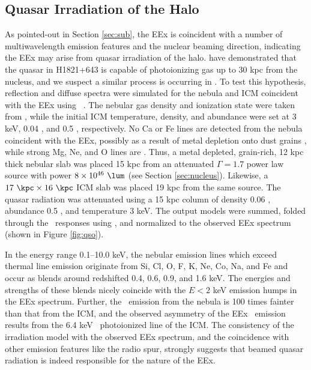 \documentclass[useAMS,usenatbib]{mn2e}
\begin{document}
\subsection{Quasar Irradiation of the Halo}

As pointed-out in Section \ref{sec:sub}, the EEx is coincident with a
number of multiwavelength emission features and the nuclear beaming
direction, indicating the EEx may arise from quasar irradiation of the
halo. \citet{2010MNRAS.402.1561R} have demonstrated that the quasar in
H1821+643 is capable of photoionizing gas up to 30 kpc from the
nucleus, and we suspect a similar process is occurring in \irs. To
test this hypothesis, reflection and diffuse spectra were simulated
for the nebula and ICM coincident with the EEx using
\cloudy\ \citep{cloudy}. The nebular gas density and ionization state
were taken from \citet{2000AJ....120..562T}, while the initial ICM
temperature, density, and abundance were set at 3 keV, 0.04 \pcc, and
0.5 \Zsol, respectively. No Ca or Fe lines are detected from the
nebula coincident with the EEx, possibly as a result of metal
depletion onto dust grains \citep[\eg][]{1993ApJ...414L..17D}, while
strong Mg, Ne, and O lines are \citep{2000AJ....120..562T}. Thus, a
metal depleted, grain-rich, 12 kpc thick nebular slab was placed 15
kpc from an attenuated $\Gamma = 1.7$ power law source with power $8
\times 10^{46} ~\lum$ (see Section \ref{sec:nucleus}). Likewise, a $17
~\kpc \times 16 ~\kpc$ ICM slab was placed 19 kpc from the same
source. The quasar radiation was attenuated using a 15 kpc column of
density 0.06 \pcc, abundance 0.5 \Zsol, and temperature 3 keV. The
output models were summed, folded through the \cxo\ responses using
\xspec, and normalized to the observed EEx spectrum (shown in Figure
\ref{fig:qso}).

In the energy range 0.1--10.0 keV, the nebular emission lines which
exceed thermal line emission originate from Si, Cl, O, F, K, Ne, Co,
Na, and Fe and occur as blends around redshifted 0.4, 0.6, 0.9, and
1.6 keV. The energies and strengths of these blends nicely coincide
with the $E < 2$ keV emission humps in the EEx spectrum. Further, the
\feka\ emission from the nebula is 100 times fainter than that from
the ICM, and the observed asymmetry of the EEx \feka\ emission results
from the 6.4 keV \feka\ photoionized line of the ICM. The consistency
of the irradiation model with the observed EEx spectrum, and the
coincidence with other emission features like the radio spur, strongly
suggests that beamed quasar radiation is indeed responsible for the
nature of the EEx.
\end{document}
